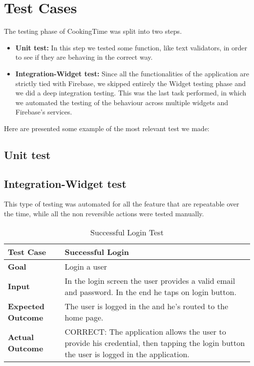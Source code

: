 \chapter{Test Cases}
The testing phase of CookingTime was split into two steps.

\begin{itemize}
	\item \textbf{Unit test:} In this step we tested some function, like text validators, in order to see if they are behaving in the correct way.
	\item \textbf{Integration-Widget test:} Since all the functionalities of the application are strictly tied with Firebase, we skipped entirely the Widget testing phase and we did a deep integration testing.
	This was the last task performed, in which we automated the testing of the behaviour across multiple widgets and Firebase's services.
\end{itemize}

Here are presented some example of the most relevant test we made:

\section{Unit test}

\section{Integration-Widget test}
This type of testing was automated for all the feature that are repeatable over the time, while all the non reversible actions were tested manually.

\begin{table}[H]
	\centering
	\begin{tabular}{|l|l|}
	\hline
	\textbf{Test Case}& Successful Login\\
	\hline
	\textbf{Goal}& Login a user\\
	\hline
	\textbf{Input}& 
	\begin{minipage}{.7\linewidth}
	In the login screen the user provides a valid email and password. In the end he taps on login button.
	\end{minipage}\\
	\hline
	\textbf{Expected Outcome}& The user is logged in the and he's routed to the home page.\\
	\hline
	\textbf{Actual Outcome}& 
	\begin{minipage}{.7\linewidth}
	CORRECT: The application allows the user to provide his credential, then tapping the login button the user is logged in the application.
	\end{minipage}\\
	\hline	
	\end{tabular}
	\caption{Successful Login Test}
\end{table}


